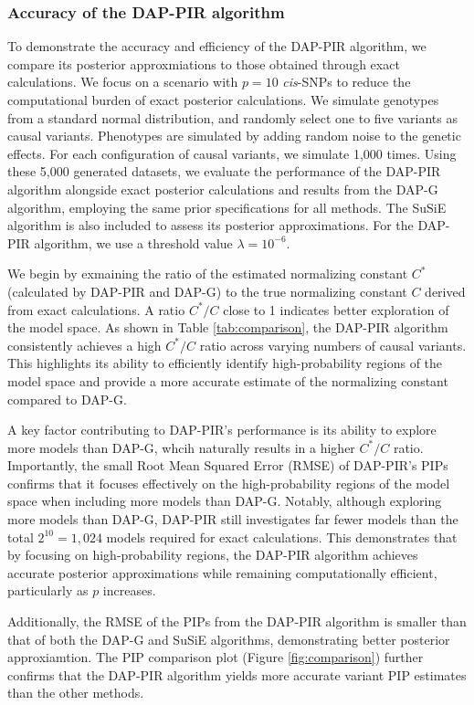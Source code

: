 \documentclass[pdflatex,sn-mathphys-num]{sn-jnl}%
\theoremstyle{thmstyleone}%
\theoremstyle{thmstyletwo}%
\theoremstyle{thmstylethree}%
\begin{document}
\subsubsection*{Accuracy of the DAP-PIR algorithm}
To demonstrate the accuracy and efficiency of the DAP-PIR algorithm, we compare its posterior approxmiations to those obtained through exact calculations. We focus on a scenario with $p=10$ \textit{cis}-SNPs to reduce the computational burden of exact posterior calculations. We simulate genotypes from a standard normal distribution, and randomly select one to five variants as causal variants. Phenotypes are simulated by adding random noise to the genetic effects. For each configuration of causal variants, we simulate 1,000 times. Using these 5,000 generated datasets, we evaluate the performance of the DAP-PIR algorithm alongside exact posterior calculations and results from the DAP-G algorithm, employing the same prior specifications for all methods. The SuSiE algorithm is also included to assess its posterior approximations. For the DAP-PIR algorithm, we use a threshold value $\lambda=10^{-6}$.

We begin by exmaining the ratio of the estimated normalizing constant $C^*$ (calculated by DAP-PIR and DAP-G) to the true normalizing constant $C$ derived from exact calculations. A ratio $C^*/C$ close to 1 indicates better exploration of the model space. As shown in Table \ref{tab:comparison}, the DAP-PIR algorithm consistently achieves a high $C^*/C$ ratio across varying numbers of causal variants. This highlights its ability to efficiently identify high-probability regions of the model space and provide a more accurate estimate of the normalizing constant compared to DAP-G.

A key factor contributing to DAP-PIR's performance is its ability to explore more models than DAP-G, whcih naturally results in a higher $C^*/C$ ratio. Importantly, the small Root Mean Squared Error (RMSE) of DAP-PIR's PIPs confirms that it focuses effectively on the high-probability regions of the model space when including more models than DAP-G. Notably, although exploring more models than DAP-G, DAP-PIR still investigates far fewer models than the total $2^{10}=1,024$ models required for exact calculations. This demonstrates that by focusing on high-probability regions, the DAP-PIR algorithm achieves accurate posterior approximations while remaining computationally efficient, particularly as $p$ increases.

Additionally, the RMSE of the PIPs from the DAP-PIR algorithm is smaller than that of both the DAP-G and SuSiE algorithms, demonstrating better posterior approxiamtion. The PIP comparison plot (Figure \ref{fig:comparison}) further confirms that the DAP-PIR algorithm yields more accurate variant PIP estimates than the other methods.
\end{document}
